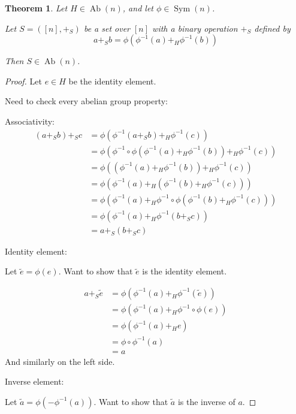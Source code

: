 \documentclass[a4paper, 12pt, english]{article}
\theoremstyle{plain}
\newtheorem{theorem}{Theorem}[section]
\theoremstyle{definition}
\newcommand{\tuple}[1]{ \left( #1 \right) } %
\DeclareMathOperator{\Ab}{Ab}
\DeclareMathOperator{\Sym}{Sym}
\begin{document}
\begin{theorem} \label{thm:abelian-conjugacy}
    Let \( H \in \Ab(n) \), and let \( \phi \in \Sym(n) \).

    Let \( S = \tuple{[n], +_S} \) be a set over \( [n] \) with a binary operation \( +_S \) defined by
    \begin{equation} \label{eq:abelian-conjugacy}
        a +_S b = \phi(\phi^{-1}(a) +_H \phi^{-1}(b))
    \end{equation}
    
    Then \( S \in \Ab(n) \).
\end{theorem}
\begin{proof}
    Let \( e \in H \) be the identity element.
    
    Need to check every abelian group property:

    Associativity:
    \begin{align*}
        (a +_S b) +_S c &= \phi(\phi^{-1}(a +_S b) +_H \phi^{-1}(c)) \\
        &= \phi(\phi^{-1} \circ \phi(\phi^{-1}(a) +_H \phi^{-1}(b)) +_H \phi^{-1}(c)) \\
        &= \phi((\phi^{-1}(a) +_H \phi^{-1}(b)) +_H \phi^{-1}(c)) \\
        &= \phi(\phi^{-1}(a) +_H (\phi^{-1}(b) +_H \phi^{-1}(c))) \\
        &= \phi(\phi^{-1}(a) +_H \phi^{-1} \circ \phi(\phi^{-1}(b) +_H \phi^{-1}(c))) \\
        &= \phi(\phi^{-1}(a) +_H \phi^{-1}(b +_S c)) \\
        &= a +_S (b +_S c)
    \end{align*}

    Identity element:

    Let \( \tilde{e} = \phi(e) \). Want to show that \( \tilde{e} \) is the identity element.

    \begin{align*}
        a +_S \tilde{e} &= \phi(\phi^{-1}(a) +_H \phi^{-1}(\tilde{e})) \\
        &= \phi(\phi^{-1}(a) +_H \phi^{-1} \circ \phi(e)) \\
        &= \phi(\phi^{-1}(a) +_H e) \\
        &= \phi \circ \phi^{-1}(a) \\
        &= a
    \end{align*}
    And similarly on the left side.

    Inverse element:

    Let \( \tilde{a} = \phi(-\phi^{-1}(a)) \). Want to show that \( \tilde{a} \) is the inverse of \( a \).


\end{proof}
\end{document}
